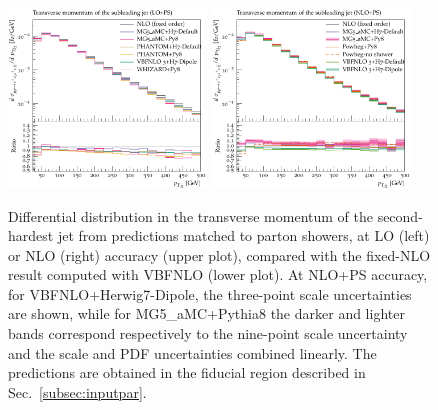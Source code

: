 \documentclass[twocolumn,epjc3]{svjour3} %
\newlength{\width}
\begin{document}
\begin{figure}
\centering
\includegraphics[width=0.47\textwidth]{figures/LOPS/pT_j2.pdf}
\includegraphics[width=0.47\textwidth]{figures/NLOPS/pT_j2.pdf}
\caption{Differential distribution in the
transverse momentum of the second-hardest jet
from predictions matched to parton showers, at LO (left) or NLO (right) accuracy (upper plot), compared with the fixed-NLO result computed with {\sc VBFNLO} (lower plot). At NLO+PS accuracy, for
    {\sc VBFNLO}+{\sc Herwig7-Dipole}, the three-point scale uncertainties are shown, while for {\sc MG5\_aMC}+{\sc Pythia8} the darker and lighter bands correspond
    respectively to the nine-point scale uncertainty and the scale and PDF uncertainties combined linearly.
    The predictions are obtained in the fiducial region described in Sec.~\protect\ref{subsec:inputpar}.}
\label{fig:PSpt2}
\end{figure}
\end{document}
